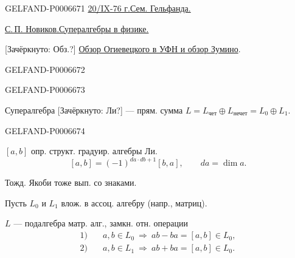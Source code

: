 \begin{GelfandAdjacentEvidence}{GELFAND-P000667}{1}
\underline{20/IX-76 г.}\quad\underline{Сем. Гельфанда.}

\underline{С.\,П. Новиков.}\quad\underline{Супералгебры в физике.}

[Зачёркнуто: Обз.?] \underline{Обзор Огиевецкого в УФН и обзор Зумино}.
\end{GelfandAdjacentEvidence}
\begin{GelfandAdjacentEvidence}{GELFAND-P000667}{2}

\end{GelfandAdjacentEvidence}
\begin{GelfandAdjacentEvidence}{GELFAND-P000667}{3}


Супералгебра [Зачёркнуто: Ли?] --- прям. сумма
\(L=L_{\text{чет}}\oplus L_{\text{нечет}}=L_0\oplus L_1\).
\end{GelfandAdjacentEvidence}
\begin{GelfandAdjacentEvidence}{GELFAND-P000667}{4}


\([a,b]\) опр. структ. градуир. алгебры Ли.
\[
[a,b]=(-1)^{da\cdot db+1}[b,a],\qquad da=\dim a.
\]
\end{GelfandAdjacentEvidence}


Тожд. Якоби тоже вып. со знаками.

Пусть \(L_0\) и \(L_1\) влож. в ассоц. алгебру (напр., матриц).

\(L\) --- подалгебра матр. алг., замкн. отн. операции
\[
\begin{aligned}
1)\quad &a,b\in L_0\ \Longrightarrow\ ab-ba=[a,b]\in L_0,\\
2)\quad &a,b\in L_1\ \Longrightarrow\ ab+ba=[a,b]\in L_0.
\end{aligned}
\]


